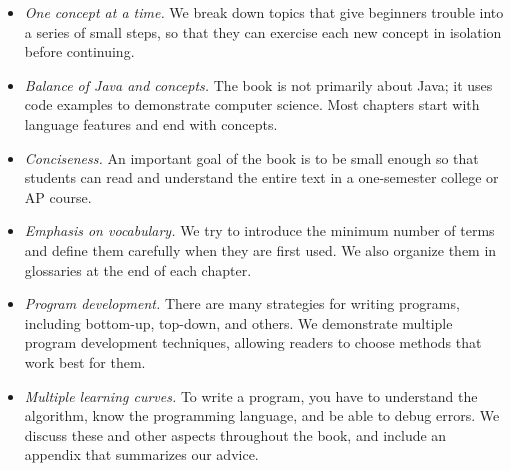 \documentclass[12pt]{book}
\theoremstyle{exercise}
\newcommand{\java}[1]{\verb"#1"}
\begin{document}
\begin{itemize}

\item {\em One concept at a time.}
We break down topics that give beginners trouble into a series of small steps, so that they can exercise each new concept in isolation before continuing.

\item {\em Balance of Java and concepts.}
The book is not primarily about Java; it uses code examples to demonstrate computer science.
Most chapters start with language features and end with concepts.

\item {\em Conciseness.}
An important goal of the book is to be small enough so that students can read and understand the entire text in a one-semester college or AP course.

\item {\em Emphasis on vocabulary.}
We try to introduce the minimum number of terms and define them carefully when they are first used.
We also organize them in glossaries at the end of each chapter.

\item {\em Program development.}
There are many strategies for writing programs, including bottom-up, top-down, and others.
We demonstrate multiple program development techniques, allowing readers to choose methods that work best for them.

\item {\em Multiple learning curves.}
To write a program, you have to understand the algorithm, know the programming language, and be able to debug errors.
We discuss these and other aspects throughout the book, and include an appendix that summarizes our advice.



\end{itemize}
\end{document}
